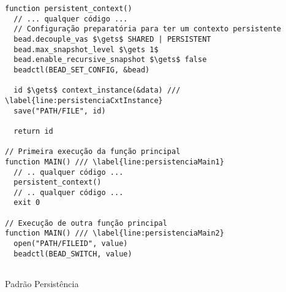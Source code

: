 \begin{pseudocode}
\begin{lstlisting}[language=pseudocode, style=pseudocode]
function persistent_context()
  // ... qualquer código ...
  // Configuração preparatória para ter um contexto persistente
  bead.decouple_vas $\gets$ SHARED | PERSISTENT
  bead.max_snapshot_level $\gets 1$
  bead.enable_recursive_snapshot $\gets$ false
  beadctl(BEAD_SET_CONFIG, &bead)

  id $\gets$ context_instance(&data) /// \label{line:persistenciaCxtInstance}
  save("PATH/FILE", id)

  return id

// Primeira execução da função principal
function MAIN() /// \label{line:persistenciaMain1}
  // .. qualquer código ...
  persistent_context()
  // .. qualquer código ...
  exit 0

// Execução de outra função principal
function MAIN() /// \label{line:persistenciaMain2}
  open("PATH/FILEID", value)
  beadctl(BEAD_SWITCH, value)
  
\end{lstlisting}

  \caption{Padrão Persistência}
  \label{alg:persistencia}
\end{pseudocode}
